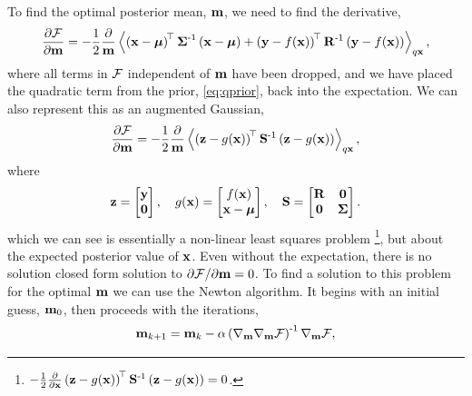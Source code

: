 \documentclass{article} %
\begin{document}
To find the optimal posterior mean, $\pomean$, we need to find the derivative,
\begin{equation}
    \frac{\partial\Fengy}{\partial\pomean} = -\frac{1}{2}
    \frac{\partial}{\pomean} \expec{q\lstate}{
        \brac{\lstate - \prmean}\transpose\prcov\inv
        \brac{\lstate - \prmean}
        + \brac{\obs - \nonlin{\lstate}}\transpose \lcov\inv
            \brac{\obs - \nonlin{\lstate}}},
\end{equation}
where all terms in $\Fengy$ independent of $\pomean$ have been dropped, and we
have placed the quadratic term from the prior, \eqref{eq:qprior}, back into the
expectation. We can also represent this as an augmented Gaussian,
\begin{equation}
    \frac{\partial\Fengy}{\partial\pomean} = -\frac{1}{2}
        \frac{\partial}{\pomean}
        \expec{q\lstate}{
        \brac{\augobs - \augnonlin{\lstate}}\transpose\augcov\inv
        \brac{\augobs - \augnonlin{\lstate}}
    },
    \label{eq:augsys}
\end{equation}
where
\begin{equation}
    \augobs = \begin{bmatrix} \obs \\ \mathbf{0} \end{bmatrix}, \quad
    \augnonlin{\lstate} = \begin{bmatrix} \nonlin{\lstate} \\ \lstate - \prmean 
        \end{bmatrix}, \quad
    \augcov = \begin{bmatrix} \lcov & \mathbf{0} \\ \mathbf{0} & \prcov 
        \end{bmatrix}.
\end{equation}
which we can see is essentially a non-linear least squares problem\!
\footnote{$-\frac{1}{2}
        \frac{\partial}{\partial\lstate}
        \brac{\augobs - \augnonlin{\lstate}}\transpose\augcov\inv
        \brac{\augobs - \augnonlin{\lstate}} = 0$.}, but about
the expected posterior value of $\lstate$. Even without the expectation, there
is no solution closed form solution to $\partial\Fengy/\partial\pomean = 0$.
To find a solution to this problem for the optimal $\pomean$ we can use the
Newton algorithm. It begins with an initial guess, $\pomean_0$, then proceeds
with the iterations,
\begin{equation}
    \pomean_{k+1} = \pomean_k -
    \step\brac{\nabla_\pomean\nabla_\pomean\Fengy}\inv \nabla_\pomean\Fengy,
    \label{eq:newton}
\end{equation}
\end{document}
